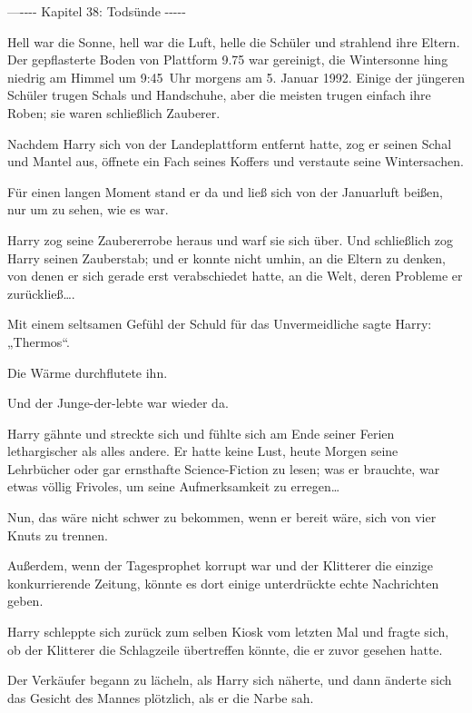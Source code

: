 

\hypertarget{todsuxfcnde}{%

—\/-\/-\/-\/- Kapitel 38: Todsünde -\/-\/-\/-\/-

Hell war die Sonne, hell war die Luft, helle die Schüler und strahlend ihre Eltern. Der gepflasterte Boden von Plattform 9.75 war gereinigt, die Wintersonne hing niedrig am Himmel um 9:45~Uhr morgens am 5. Januar 1992. Einige der jüngeren Schüler trugen Schals und Handschuhe, aber die meisten trugen einfach ihre Roben; sie waren schließlich Zauberer.

Nachdem Harry sich von der Landeplattform entfernt hatte, zog er seinen Schal und Mantel aus, öffnete ein Fach seines Koffers und verstaute seine Wintersachen.

Für einen langen Moment stand er da und ließ sich von der Januarluft beißen, nur um zu sehen, wie es war.

Harry zog seine Zaubererrobe heraus und warf sie sich über. Und schließlich zog Harry seinen Zauberstab; und er konnte nicht umhin, an die Eltern zu denken, von denen er sich gerade erst verabschiedet hatte, an die Welt, deren Probleme er zurückließ….

Mit einem seltsamen Gefühl der Schuld für das Unvermeidliche sagte Harry: „Thermos“.

Die Wärme durchflutete ihn.

Und der Junge-der-lebte war wieder da.

Harry gähnte und streckte sich und fühlte sich am Ende seiner Ferien lethargischer als alles andere. Er hatte keine Lust, heute Morgen seine Lehrbücher oder gar ernsthafte Science-Fiction zu lesen; was er brauchte, war etwas völlig Frivoles, um seine Aufmerksamkeit zu erregen…

Nun, das wäre nicht schwer zu bekommen, wenn er bereit wäre, sich von vier Knuts zu trennen.

Außerdem, wenn der Tagesprophet korrupt war und der Klitterer die einzige konkurrierende Zeitung, könnte es dort einige unterdrückte echte Nachrichten geben.

Harry schleppte sich zurück zum selben Kiosk vom letzten Mal und fragte sich, ob der Klitterer die Schlagzeile übertreffen könnte, die er zuvor gesehen hatte.

Der Verkäufer begann zu lächeln, als Harry sich näherte, und dann änderte sich das Gesicht des Mannes plötzlich, als er die Narbe sah.

}
